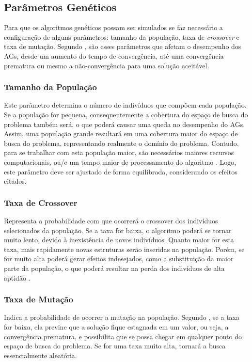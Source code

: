 \subsection{Parâmetros Genéticos}

Para que os algoritmos genéticos possam ser simulados se faz necessário a configuração de alguns parâmetros: tamanho da população, taxa de \textit{crossover} e taxa de mutação. Segundo \cite{catarina03}, são esses parâmetros que afetam o desempenho dos AGs, desde um aumento do tempo de convergência, até uma convergência prematura ou mesmo a não-convergência para uma solução aceitável.


\subsubsection{Tamanho da População}


Este parâmetro determina o número de indivíduos que compõem cada população. Se a população for pequena, consequentemente a cobertura do espaço de busca do problema também será, o que poderá causar uma queda no desempenho do AGs. Assim, uma população grande resultará em uma cobertura maior do espaço de busca do problema, representando realmente o domínio do problema. Contudo, para se trabalhar com esta população maior, são necessários maiores recursos computacionais, ou/e um tempo maior de processamento do algoritmo \cite{catarina03}. Logo, este parâmetro deve ser ajustado de forma equilibrada, considerando os efeitos citados.

\subsubsection{Taxa de Crossover}


Representa a probabilidade com que ocorrerá o crossover dos indivíduos selecionados da população. Se a taxa for baixa, o algoritmo poderá se tornar muito lento, devido à inexistência de novos indivíduos. Quanto maior for esta taxa, mais rapidamente novas estruturas serão inseridas na população. Porém, se for muito alta poderá gerar efeitos indesejados, como a substituição da maior parte da população, o que poderá resultar na perda dos indivíduos de alta aptidão \cite{catarina03}.

\subsubsection{Taxa de Mutação}


Indica a probabilidade de ocorrer a mutação na população. Segundo \cite{catarina03}, se a taxa for baixa, ela previne que a solução fique estagnada em um valor, ou seja, a convergência prematura, e possibilita que se possa chegar em qualquer ponto do espaço de busca do problema. Se for uma taxa muito alta, tornará a busca essencialmente aleatória.

